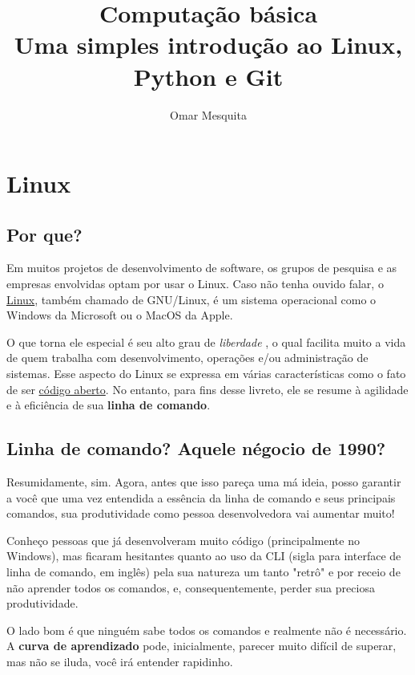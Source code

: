 \documentclass{article}
\begin{document}
	\title {Computação básica \\[1ex] \large Uma simples introdução ao Linux, Python e Git}
	\date{}
	\author{Omar Mesquita}
	\maketitle
	
	\newpage
	\tableofcontents
	\newpage

	\section{Linux}
	\subsection{Por que?}
	
	Em muitos projetos de desenvolvimento de software, os grupos de pesquisa e as empresas envolvidas optam por  
	usar o Linux. Caso não tenha ouvido falar, o \href{https://pt.wikipedia.org/wiki/Linux}{Linux}, também chamado de GNU/Linux, é um sistema operacional como o 
	Windows da Microsoft ou o MacOS da Apple. 


	O que torna ele especial é seu alto grau de \textit{liberdade} , o qual facilita muito a vida de quem trabalha com 
	desenvolvimento, operações e/ou administração de sistemas. Esse aspecto do Linux se expressa em várias características 
	como o fato de ser \href{https://pt.wikipedia.org/wiki/C%C3%B3digo_aberto}{código aberto}. No entanto, para fins desse livreto, ele se resume à agilidade
	e à eficiência de sua \textbf{linha de comando}.

	\subsection{Linha de comando? Aquele négocio de 1990?} 

	Resumidamente, sim. Agora, antes que isso pareça uma má ideia, posso garantir a você que uma vez entendida a essência da
	linha de comando e seus principais comandos, sua produtividade como pessoa desenvolvedora vai aumentar muito! 

	Conheço pessoas que já desenvolveram muito código (principalmente no Windows), 
	mas ficaram hesitantes quanto ao uso da CLI (sigla para interface de linha de comando, em inglês) 
	pela sua natureza um tanto "retrô" e por receio de não aprender todos os comandos, e,
	consequentemente, perder sua preciosa produtividade. 

	O lado bom é que ninguém sabe todos os comandos e realmente não é necessário. A \textbf{curva de aprendizado} pode, 
	inicialmente, parecer muito difícil de superar, mas não se iluda, você irá entender rapidinho. 
\end{document}
